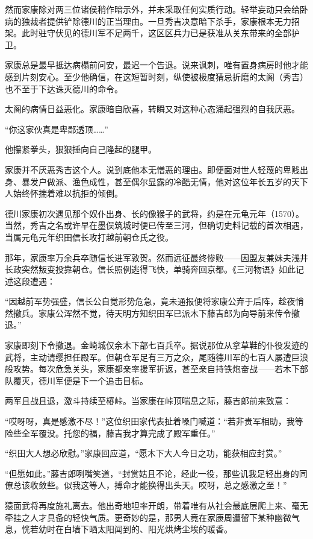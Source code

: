 \documentclass[
]{article}
\begin{document}
然而家康除对两三位诸侯稍作暗示外，并未采取任何实质行动。轻举妄动只会给卧病的独裁者提供铲除德川的正当理由。一旦秀吉决意暗下杀手，家康根本无力招架。此时驻守伏见的德川军不足两千，这区区兵力已是获准从关东带来的全部护卫。

家康总是最早抵达病榻前问安，最迟一个告退。说来讽刺，唯有置身病房时他才能感到片刻安心。至少他确信，在这短暂时刻，纵使被极度猜忌折磨的太阁（秀吉）也不至于下达诛灭德川的命令。

太阁的病情日益恶化。家康暗自欣喜，转瞬又对这种心态涌起强烈的自我厌恶。

``你这家伙真是卑鄙透顶\ldots\ldots{}''

他攥紧拳头，狠狠捶向自己隆起的腿甲。

家康并不厌恶秀吉这个人。说到底他本无憎恶的理由。即便面对世人轻蔑的卑贱出身、暴发户做派、渔色成性，甚至偶尔显露的冷酷无情，他对这位年长五岁的天下人始终怀揣着难以抗拒的倾倒。

德川家康初次遇见那个奴仆出身、长的像猴子的武将，约是在元龟元年（1570）。当然，秀吉之名或许早在墨俣筑城时便已传至三河，但确切史料记载的首次相遇，当属元龟元年织田信长攻打越前朝仓氏之役。

那年，家康率万余兵卒随信长进军敦贺。然而远征最终惨败------因盟友兼妹夫浅井长政突然叛变投靠朝仓。信长照例逃得飞快，单骑奔回京都。《三河物语》如此记述这段遭遇：

``因越前军势强盛，信长公自觉形势危急，竟未通报便将家康公弃于后阵，趁夜悄然撤兵。家康公浑然不觉，待天明方知织田军已派木下藤吉郎为向导前来传令撤退。''

家康即刻下令撤退。金崎城仅余木下部七百兵卒。据说那位从拿草鞋的仆役发迹的武将，主动请缨担任殿军。但朝仓军足有三万之众，尾随德川军的七百人屡遭巨浪般攻势。每次危急关头，家康都亲率援军折返，甚至亲自持铁炮奋战------若木下部队覆灭，德川军便是下一个追击目标。

两军且战且退，激斗持续至椿峠。当家康在峠顶喘息之际，藤吉郎前来致意：

``哎呀呀，真是感激不尽！''这位织田家代表扯着嗓门喊道：``若非贵军相助，我等险些全军覆没。托您的福，藤吉我才算完成了殿军重任。''

``织田大人想必欣慰。''家康回应道，``愿木下大人今日之功，能获相应封赏。''

``但愿如此。''藤吉郎咧嘴笑道，``封赏姑且不论，经此一役，那些讥我足轻出身的同僚总该收敛些。似我这等人，搏命才能换得出头天。哎呀，总之感激之至！''

猿面武将再度施礼离去。他出奇地坦率开朗，带着唯有从社会最底层爬上来、毫无牵挂之人才具备的轻快气质。更奇妙的是，那男人竟在家康周遭留下某种幽微气息，恍若幼时在白墙下晒太阳闻到的、阳光烘烤尘埃的暖香。
\end{document}
